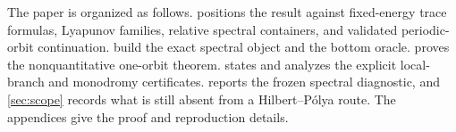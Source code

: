 The paper is organized as follows.   positions the result
against fixed-energy trace formulas, Lyapunov families, relative spectral
containers, and validated periodic-orbit continuation.
 build the exact spectral object and
the bottom oracle.   proves the nonquantitative
one-orbit theorem.   states and analyzes the
explicit local-branch and monodromy certificates.
 reports the frozen spectral diagnostic, and
\cref{sec:scope} records what is still absent from a Hilbert--P\'olya route.
The appendices give the proof and reproduction details.
